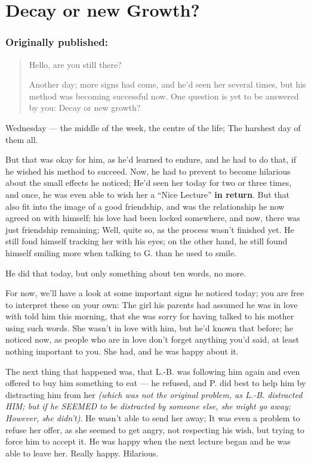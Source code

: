\chapter{Decay or new Growth?}
\label{cha:decay-or-new-growth}
\subsection*{Originally published: }
\begin{quote}
Hello, are you still there?

Another day; more signs had come, and he'd seen her several times, but his method was becoming successful now. One question is yet to be answered by you: Decay or new growth?
\end{quote}

Wednesday --- the middle of the week, the centre of the life; The harshest day of them all.

But that was okay for him, as he'd learned to endure, and he had to do that, if he wished his method to succeed. Now, he had to prevent to become hilarious about the small effects he noticed; He'd seen her today for two or three times, and once, he was even able to wish her a \enquote{Nice Lecture} \textbf{in return}. But that also fit into the image of a good friendship, and was the relationship he now agreed on with himself; his love had been locked somewhere, and now, there was just friendship remaining; Well, quite so, as the process wasn't finished yet. He still fond himself tracking her with his eyes; on the other hand, he still found himself smiling more when talking to G. than he used to smile.

He did that today, but only something about ten words, no more.

For now, we'll have a look at some important signs he noticed today; you are free to interpret these on your own: 
The girl his parents had assumed he was in love with told him this morning, that she was sorry for having talked to his mother using such words. 
She wasn't in love with him, but he'd known that before; he noticed now, as people who are in love don't forget anything you'd said, at least nothing important to you. 
She had, and he was happy about it.

The next thing that happened was, that L.-B. was following him again and even offered to buy him something to eat --- he refused, and P. did best to help him by distracting him from her \emph{(which was not the original problem, as L.-B. distracted HIM; but if he SEEMED to be distracted by someone else, she might go away; However, she didn't)}.
He wasn't able to send her away; It was even a problem to refuse her offer, as she seemed to get angry, not respecting his wish, but trying to force him to accept it. 
He was happy when the next lecture began and he was able to leave her. 
Really happy. 
Hilarious.

